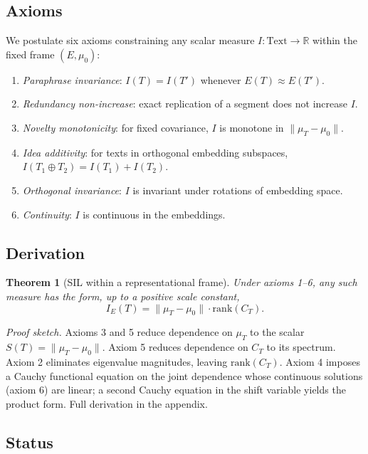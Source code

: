 \documentclass[11pt]{article}
\newtheorem{theorem}{Theorem}
\begin{document}
\subsection{Axioms}

We postulate six axioms constraining any scalar measure $I : \text{Text} \to \mathbb{R}$ within the fixed frame $(E, \mu_0)$:

\begin{enumerate}
\item \emph{Paraphrase invariance}: $I(T) = I(T')$ whenever $E(T) \approx E(T')$.
\item \emph{Redundancy non-increase}: exact replication of a segment does not increase $I$.
\item \emph{Novelty monotonicity}: for fixed covariance, $I$ is monotone in $\|\mu_T - \mu_0\|$.
\item \emph{Idea additivity}: for texts in orthogonal embedding subspaces, $I(T_1 \oplus T_2) = I(T_1) + I(T_2)$.
\item \emph{Orthogonal invariance}: $I$ is invariant under rotations of embedding space.
\item \emph{Continuity}: $I$ is continuous in the embeddings.
\end{enumerate}

\subsection{Derivation}

\begin{theorem}[SIL within a representational frame]\label{thm:sil}
Under axioms 1--6, any such measure has the form, up to a positive scale constant,
\[
I_E(T) = \|\mu_T - \mu_0\| \cdot \mathrm{rank}(C_T).
\]
\end{theorem}

\noindent\emph{Proof sketch.} Axioms 3 and 5 reduce dependence on $\mu_T$ to the scalar $S(T) = \|\mu_T - \mu_0\|$. Axiom 5 reduces dependence on $C_T$ to its spectrum. Axiom 2 eliminates eigenvalue magnitudes, leaving $\mathrm{rank}(C_T)$. Axiom 4 imposes a Cauchy functional equation on the joint dependence whose continuous solutions (axiom 6) are linear; a second Cauchy equation in the shift variable yields the product form. Full derivation in the appendix.

\subsection{Status}
\end{document}

